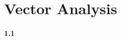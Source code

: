\documentclass[../main.tex]{subfiles}
\begin{document}
\section{Vector Analysis}

\paragraph*{1.1}
\end{document}
